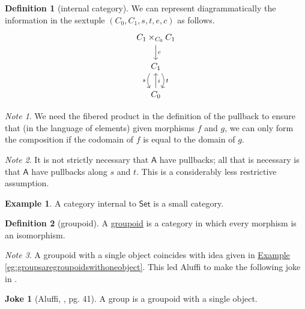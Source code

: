 \documentclass[a4paper,10pt]{scrreprt}
\newcommand{\defn}[1]{\ul{#1}}
\theoremstyle{definition}
\newtheorem{definition}{Definition}[section]
\newtheorem{example}{Example}[section]
\newtheorem{joke}{Joke}[section]
\theoremstyle{plain}
\theoremstyle{remark}
\newtheorem{note}{Note}[section]
\begin{document}
\begin{definition}[internal category]
  We can represent diagrammatically the information in the sextuple $(C_{0}, C_{1}, s, t, e, c)$ as follows.
  \begin{equation*}
    \begin{tikzcd}
      C_{1} \times_{C_{0}} C_{1}
      \arrow[d, "c"]
      \\
      C_{1}
      \arrow[d, shift left, bend left, "t"]
      \arrow[d, shift right, bend right, swap, "s"]
      \\
      C_{0}
      \arrow[u, swap, "i"]
    \end{tikzcd}
  \end{equation*}
\end{definition}

\begin{note}
  We need the fibered product in the definition of the pullback to ensure that (in the language of elements) given morphisms $f$ and $g$, we can only form the composition if the codomain of $f$ is equal to the domain of $g$.
\end{note}

\begin{note}
  \label{note:internalcategoriesdontneedallpullbacks}
  It is not strictly necessary that $\mathsf{A}$ have pullbacks; all that is necessary is that $\mathsf{A}$ have pullbacks along $s$ and $t$. This is a considerably less restrictive assumption.
\end{note}

\begin{example}
  A category internal to $\mathsf{Set}$ is a small category.
\end{example}

\begin{definition}[groupoid]
  \label{def:groupoid}
  A \defn{groupoid} is a category in which every morphism is an isomorphism.
\end{definition}

\begin{note}
  A groupoid with a single object coincides with idea given in \hyperref[eg:groupsaregroupoidswithoneobject]{Example \ref*{eg:groupsaregroupoidswithoneobject}}. This led Aluffi to make the following joke in \cite{aluffi-algebra-chapter-0}.
\end{note}

\begin{joke}[Aluffi, \cite{aluffi-algebra-chapter-0}, pg. 41]
  A group is a groupoid with a single object.
\end{joke}
\end{document}
